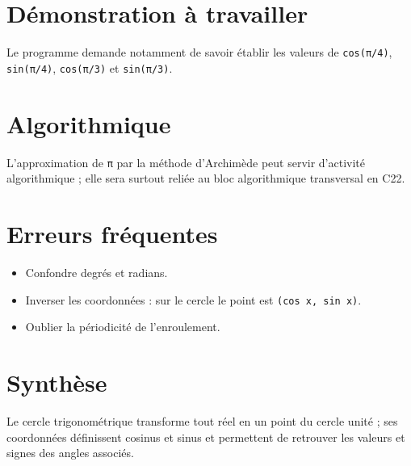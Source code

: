 \section{Démonstration à travailler}
Le programme demande notamment de savoir établir les valeurs de \texttt{cos(π/4)}, \texttt{sin(π/4)}, \texttt{cos(π/3)} et \texttt{sin(π/3)}.

\section{Algorithmique}
L'approximation de \texttt{π} par la méthode d'Archimède peut servir d'activité algorithmique ; elle sera surtout reliée au bloc algorithmique transversal en C22.

\section{Erreurs fréquentes}
\begin{itemize}
\item Confondre degrés et radians.
\item Inverser les coordonnées : sur le cercle le point est \texttt{(cos x, sin x)}.
\item Oublier la périodicité de l'enroulement.
\end{itemize}

\section{Synthèse}
Le cercle trigonométrique transforme tout réel en un point du cercle unité ; ses coordonnées définissent cosinus et sinus et permettent de retrouver les valeurs et signes des angles associés.
